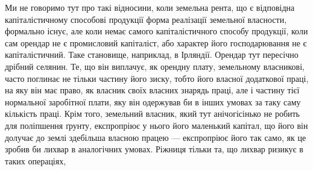 Ми не говоримо тут про такі відносини, коли земельна рента, що є відповідна
капіталістичному способові продукції форма реалізації земельної власности,
формально існує, але коли немає самого капіталістичного способу продукції,
коли сам орендар не є промисловий капіталіст, або характер його господарювання
не є капіталістичний. Таке становище, наприклад, в Ірляндії. Орендар
тут пересічно дрібний селянин. Те, що він виплачує, як орендну плату, земельному
власникові, часто поглинає не тільки частину його зиску, тобто його
власної додаткової праці, на яку він має право, як власник своїх власних
знарядь праці, але і частину тієї нормальної заробітної плати, яку він одержував
би в інших умовах за таку саму кількість праці. Крім того, земельний
власник, який тут анічогісінько не робить для поліпшення ґрунту, експропріює
у нього його маленький капітал, що його він долучає до землі здебільша
власною працею — експропріює його так само, як це зробив би лихвар в аналогічних
умовах. Ріжниця тільки та, що лихвар ризикує в таких операціях,
\parbreak{}  %
